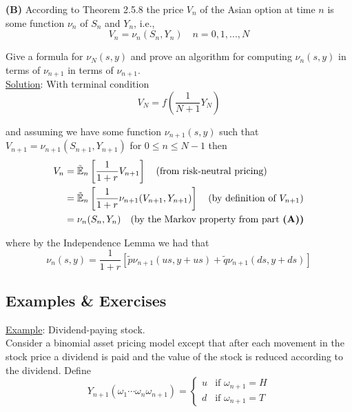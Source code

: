 \documentclass[12pt]{article}
\newlength\tindent
\renewcommand{\indent}{\hspace*{\tindent}}
\newcommand{\E}{\mathbb E}
\begin{document}
{\bf (B)} According to Theorem 2.5.8 the price $V_n$ of the Asian option at time $n$ is some function $\nu_n$ of $S_n$ and $Y_n$, i.e.,
\begin{equation*}
	V_n = \nu_n(S_n, Y_n) \quad n = 0, 1,..., N
\end{equation*}

\indent Give a formula for $\nu_N(s,y)$ and prove an algorithm for computing $\nu_n(s,y)$ in terms of $\nu_{n + 1}$ in terms of $\nu_{n + 1}$. \\

\underline{Solution}: With terminal condition
\begin{equation*}
	V_N = f\left( \frac{1}{N + 1} Y_N \right)
\end{equation*}

and assuming we have some function $\nu_{n + 1}(s,y)$ such that $V_{n+ 1} = \nu_{n + 1}(S_{n + 1}, Y_{n + 1})$ for $0 \leq n \leq N - 1$ then
\begin{align*}
	V_n &= \tilde{\E}_n \left[ \frac{1}{1 + r} V_{n + 1} \right] \quad \text{(from risk-neutral pricing)} \\
	&= \tilde{\E}_n \left[ \frac{1}{1 + r}\nu_{n + 1}(V_{n + 1}, Y_{n + 1}) \right] \quad \text{(by definition of $V_{n + 1}$)} \\
	&= \nu_n(S_n, Y_n) \quad \text{(by the Markov property from part {\bf (A))}} \\
\end{align*}

where by the Independence Lemma we had that
\begin{equation*}
	\nu_n(s,y) = \frac{1}{1 + r}[ \tilde{p}\nu_{n + 1}(us, y + us) + \tilde{q}\nu_{n + 1}(ds, y + ds)]
\end{equation*}

\subsection{Examples \& Exercises}

\underline{Example}: Dividend-paying stock. \\

\indent Consider a binomial asset pricing model except that after each movement in the stock price a dividend is paid and the value of the stock is reduced according to the dividend. Define
\begin{equation*}
	Y_{n + 1}(\omega_1\cdots\omega_n\omega_{n + 1}) = 
	\begin{cases}
		u & \text{if } \omega_{n + 1} = H \\
		d & \text{if } \omega_{n + 1} = T
	\end{cases}
\end{equation*}
\end{document}
